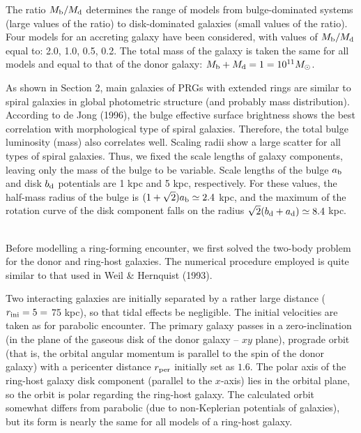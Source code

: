 The ratio $M_{\rm b}/M_{\rm d}$ determines the range of models 
from bulge-dominated systems (large values of the ratio) to 
disk-dominated galaxies (small values of the ratio). Four models 
for an accreting galaxy have been considered, with values of 
$M_{\rm b}/M_{\rm d}$ equal to: 2.0, 1.0, 0.5, 0.2. 
The total mass of the galaxy is taken the same for 
all models and equal to that of the donor galaxy: 
$M_{\rm b} + M_{\rm d} = 1 = 10^{11} M_{\odot}$.

As shown in Section 2, main galaxies of PRGs with extended 
rings are similar to spiral galaxies in global photometric 
structure (and probably mass distribution). 
According to de Jong (1996), the bulge effective surface brightness 
shows the best correlation 
with morphological type of spiral galaxies. Therefore, 
the total bulge luminosity (mass) also correlates well. 
Scaling 
radii show a large scatter for all types of spiral galaxies. 
Thus, we fixed the scale lengths 
of galaxy components, leaving only the mass of the bulge to be 
variable. Scale lengths of the bulge $a_{\rm b}$ and disk $b_{\rm d}$ 
potentials are 1 kpc and 5 kpc, respectively. For these values, the 
half-mass radius of the bulge is $(1+\sqrt{2})a_{\rm b}\simeq 2.4$ kpc, 
and the maximum of the rotation curve of the disk component falls on 
the radius $\sqrt{2}(b_{\rm d}+a_{\rm d})\simeq8.4$ kpc. \\ \\

Before modelling a ring-forming encounter, we first solved the 
two-body problem for the donor and ring-host galaxies. 
The numerical procedure employed is quite similar to that
used in Weil \& Hernquist (1993). 

Two interacting galaxies are initially separated by a rather large 
distance ($r_{\rm ini} = 5 =$ 75 kpc), so that tidal effects be negligible.
The initial velocities are taken as for parabolic encounter. 
The primary galaxy passes in a zero-inclination 
(in the plane of the gaseous disk of the donor galaxy -- $xy$ 
plane), prograde orbit (that is, the orbital angular momentum is parallel 
to the spin of the donor galaxy) with a pericenter distance 
$r_{\rm per}$ initially set as $1.6$. The polar axis of the ring-host 
galaxy disk component (parallel to the $x$-axis) lies in the orbital 
plane, so the orbit is polar regarding the ring-host galaxy.
The calculated orbit somewhat differs from parabolic (due to 
non-Keplerian potentials of galaxies), but its form is nearly the same 
for all models of a ring-host galaxy. 

